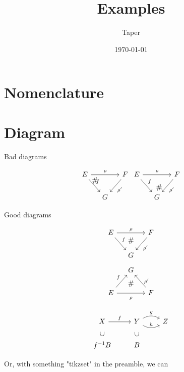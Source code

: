 \documentclass{article}
\title{Examples}
\date{\today}
\author{Taper}
\begin{document}
\maketitle
{}
\tableofcontents
\section{Nomenclature}


\section{Diagram}

\begin{center}
    Bad diagrams
\end{center}
$$
    \begin{tikzcd}[column sep=small]
        E \ar[dr,"f"]\ar[rr,"\rho"]\ar[drr, phantom, "\#", very near
        start] & & F\ar[dl,"\rho'"] \\
        & G &  \,
    \end{tikzcd}
    \begin{tikzcd}[column sep=small]
        E \ar[dr,"f"]\ar[rr,"\rho"]\ar[drr, phantom, "\#"] & & F\ar[dl,"\rho'"] \\
        & G &  \,
    \end{tikzcd}
$$
\begin{center}
    Good diagrams
\end{center}
$$
    \begin{tikzcd}[column sep=small]
        E \ar[dr,"f"]\ar[rr,"\rho"] &
        \ar[d,phantom, "\#", near start] & F\ar[dl,"\rho'"] \\
        & G &  \,
    \end{tikzcd}
$$
$$ \begin{tikzcd}[column sep=small]
& G &  \, \\
E \ar[ur,"f"]\ar[rr,"\rho" below=3] &
\ar[u,phantom, "\#"] 
& F\ar[ul,"\rho'" right=3]
\end{tikzcd} $$

$$ \begin{tikzcd}[]
X\ar[r,"f"] & Y \ar[r,"g",bend left]\ar[r,"h",bend right]
& Z \\
f^{-1}B\ar[u,phantom,"\subset"
{anchor=south,rotate=90,left=0,near end}]
&
B\ar[u,phantom,"\subset" {anchor=south,rotate=90,left=0,near
      	end}] & \, 
\end{tikzcd}$$

Or, with something "tikzset" in the preamble, we can
\end{document}
